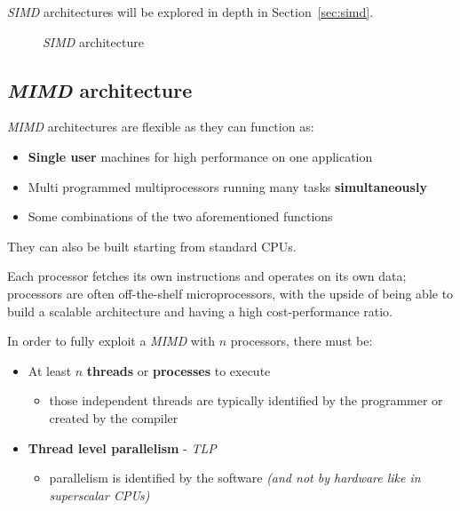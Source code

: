 \documentclass[english]{article}
\begin{document}
\bigskip
\textit{SIMD} architectures will be explored in depth in Section~\ref{sec:simd}.

\begin{figure}[htbp]
  \bigskip
  \centering
  \caption{\textit{SIMD} architecture}
  \label{fig:simd-architecture}
  \bigskip
\end{figure}

\subsection{\textit{MIMD} architecture}

\textit{MIMD} architectures are flexible as they can function as:

\begin{itemize}
  \item \textbf{Single user} machines for high performance on one application
  \item Multi programmed multiprocessors running many tasks \textbf{simultaneously}
  \item Some combinations of the two aforementioned functions
\end{itemize}

They can also be built starting from standard CPUs.

\bigskip
Each processor fetches its own instructions and operates on its own data;
processors are often off-the-shelf microprocessors, with the upside of being able to build a scalable architecture and having a high cost-performance ratio.

In order to fully exploit a \textit{MIMD} with \(n\) processors, there must be:

\begin{itemize}
  \item At least \(n\) \textbf{threads} or \textbf{processes}  to execute
        \begin{itemize}
          \item those independent threads are typically identified by the programmer or created by the compiler
        \end{itemize}
  \item \textbf{Thread level parallelism} - \textit{TLP}
        \begin{itemize}
          \item parallelism is identified by the software \textit{(and not by hardware like in superscalar CPUs)}
        \end{itemize}
\end{itemize}
\end{document}
